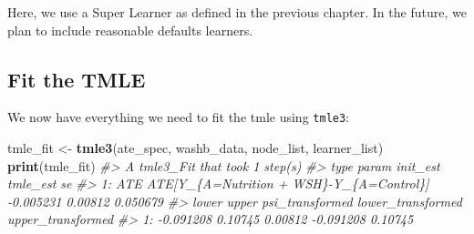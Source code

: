 \documentclass[12pt, krantz2,]{book}
\newenvironment{Shaded}{\begin{snugshade}}{\end{snugshade}}
\newcommand{\CommentTok}[1]{\textcolor[rgb]{0.56,0.35,0.01}{\textit{#1}}}
\newcommand{\DataTypeTok}[1]{\textcolor[rgb]{0.13,0.29,0.53}{#1}}
\newcommand{\KeywordTok}[1]{\textcolor[rgb]{0.13,0.29,0.53}{\textbf{#1}}}
\newcommand{\NormalTok}[1]{#1}
\newcommand{\OperatorTok}[1]{\textcolor[rgb]{0.81,0.36,0.00}{\textbf{#1}}}
\newcommand{\StringTok}[1]{\textcolor[rgb]{0.31,0.60,0.02}{#1}}
\theoremstyle{definition}
\theoremstyle{definition}
\theoremstyle{definition}
\newcommand{\1}{\mathbbm{1}}
\begin{document}
\begin{Shaded}
\end{Shaded}

Here, we use a Super Learner as defined in the previous chapter. In the future,
we plan to include reasonable defaults learners.

\hypertarget{fit-the-tmle}{%
\subsection{Fit the TMLE}\label{fit-the-tmle}}

We now have everything we need to fit the tmle using \texttt{tmle3}:

\begin{Shaded}
\begin{Highlighting}[]
\NormalTok{tmle_fit <-}\StringTok{ }\KeywordTok{tmle3}\NormalTok{(ate_spec, washb_data, node_list, learner_list)}
\KeywordTok{print}\NormalTok{(tmle_fit)}
\CommentTok{#> A tmle3_Fit that took 1 step(s)}
\CommentTok{#>    type                                    param  init_est tmle_est       se}
\CommentTok{#> 1:  ATE ATE[Y_\{A=Nutrition + WSH\}-Y_\{A=Control\}] -0.005231  0.00812 0.050679}
\CommentTok{#>        lower   upper psi_transformed lower_transformed upper_transformed}
\CommentTok{#> 1: -0.091208 0.10745         0.00812         -0.091208           0.10745}
\end{Highlighting}
\end{Shaded}
\end{document}
